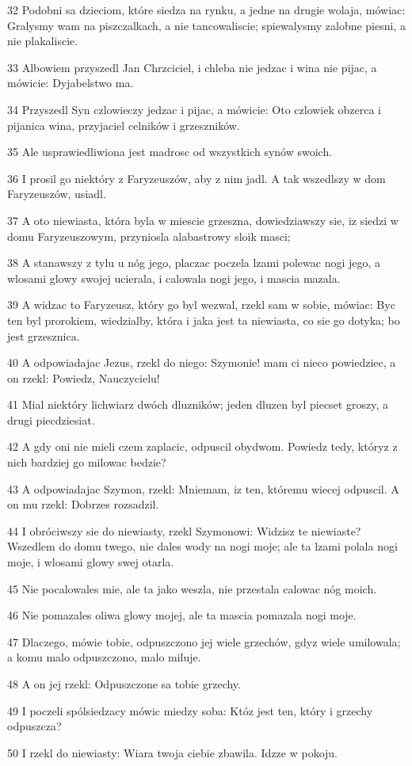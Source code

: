 \par 32 Podobni sa dzieciom, które siedza na rynku, a jedne na drugie wolaja, mówiac: Gralysmy wam na piszczalkach, a nie tancowaliscie; spiewalysmy zalobne piesni, a nie plakaliscie.
\par 33 Albowiem przyszedl Jan Chrzciciel, i chleba nie jedzac i wina nie pijac, a mówicie: Dyjabelstwo ma.
\par 34 Przyszedl Syn czlowieczy jedzac i pijac, a mówicie: Oto czlowiek obzerca i pijanica wina, przyjaciel celników i grzeszników.
\par 35 Ale usprawiedliwiona jest madrosc od wszystkich synów swoich.
\par 36 I prosil go niektóry z Faryzeuszów, aby z nim jadl. A tak wszedlszy w dom Faryzeuszów, usiadl.
\par 37 A oto niewiasta, która byla w miescie grzeszna, dowiedziawszy sie, iz siedzi w domu Faryzeuszowym, przyniosla alabastrowy sloik masci;
\par 38 A stanawszy z tylu u nóg jego, placzac poczela lzami polewac nogi jego, a wlosami glowy swojej ucierala, i calowala nogi jego, i mascia mazala.
\par 39 A widzac to Faryzeusz, który go byl wezwal, rzekl sam w sobie, mówiac: Byc ten byl prorokiem, wiedzialby, która i jaka jest ta niewiasta, co sie go dotyka; bo jest grzesznica.
\par 40 A odpowiadajac Jezus, rzekl do niego: Szymonie! mam ci nieco powiedziec, a on rzekl: Powiedz, Nauczycielu!
\par 41 Mial niektóry lichwiarz dwóch dluzników; jeden dluzen byl piecset groszy, a drugi piecdziesiat.
\par 42 A gdy oni nie mieli czem zaplacic, odpuscil obydwom. Powiedz tedy, któryz z nich bardziej go milowac bedzie?
\par 43 A odpowiadajac Szymon, rzekl: Mniemam, iz ten, któremu wiecej odpuscil. A on mu rzekl: Dobrzes rozsadzil.
\par 44 I obróciwszy sie do niewiasty, rzekl Szymonowi: Widzisz te niewiaste? Wszedlem do domu twego, nie dales wody na nogi moje; ale ta lzami polala nogi moje, i wlosami glowy swej otarla.
\par 45 Nie pocalowales mie, ale ta jako weszla, nie przestala calowac nóg moich.
\par 46 Nie pomazales oliwa glowy mojej, ale ta mascia pomazala nogi moje.
\par 47 Dlaczego, mówie tobie, odpuszczono jej wiele grzechów, gdyz wiele umilowala; a komu malo odpuszczono, malo miluje.
\par 48 A on jej rzekl: Odpuszczone sa tobie grzechy.
\par 49 I poczeli spólsiedzacy mówic miedzy soba: Któz jest ten, który i grzechy odpuszcza?
\par 50 I rzekl do niewiasty: Wiara twoja ciebie zbawila. Idzze w pokoju.

